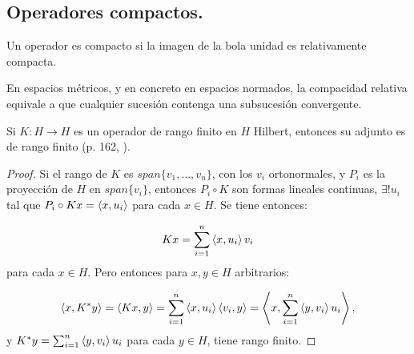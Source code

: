 \subsection{Operadores compactos.}

\begin{definition}
  Un operador es compacto si la imagen de la bola unidad es relativamente
  compacta.
\end{definition}

\begin{remark}
  En espacios métricos, y en concreto en espacios normados, la compacidad
  relativa equivale a que cualquier sucesión contenga una subsucesión
  convergente.
\end{remark}

\begin{lemma}
  \label{le:finite-range-adjoint}
  Si $K:H\to H$ es un operador de rango finito en $H$ Hilbert, entonces su
  adjunto es de rango finito (p. 162, \cite{cascales2012}).
\end{lemma}
\begin{proof}
  Si el rango de $K$ es $span\{v_1,\ldots,v_n\}$, con los $v_i$ ortonormales, y
  $P_i$ es la proyección de $H$ en $span \{v_i\}$, entonces $P_i\circ K$ son
  formas lineales continuas, $\exists ! u_i$ tal que $P_i\circ K x =
  \left\langle x,u_i\right\rangle$ para cada $x\in H$. Se tiene entonces:

   \[
  Kx = \sum_{i=1}^{n} \left\langle x,u_i\right\rangle v_i
  \] 
  para cada $x\in H$. Pero entonces para $x,y\in H$ arbitrarios:

  \[
  \left\langle x,K^*y\right\rangle=\left\langle Kx,y\right\rangle=\sum_{i=1}^{n} \left\langle x,u_i\right\rangle\left\langle v_i,y\right\rangle=
  \left\langle x,\sum_{i=1}^{n} \left\langle y,v_i\right\rangle u_i\right\rangle
  ,\] 
  y $K^*y=\sum_{i=1}^{n} \left\langle y,v_i\right\rangle u_i$ para cada $y\in H$, tiene rango
  finito.
\end{proof}


